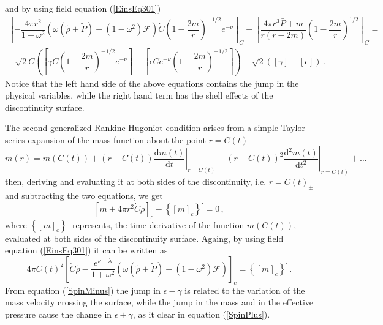 \documentclass[notitlepage,letterpaper, 10pt]{article}
\begin{document}
and by using field equation (\ref{EinsEq301})
\begin{align}
\left[ -\dfrac{4 \pi r^{2}}{1+\omega^{2}} \left(\omega \left(\tilde{\rho} + \tilde{P} \right)+ \left(1-\omega^{2} \right)\mathcal{F} \right) \dot{C} \left(1-\dfrac{2m}{r} \right)^{-1/2} e^{-\nu} \right]_{C} 
 \nonumber 
+ \left[\dfrac{4\pi r^{3}\bar{P}+m}{r \left( r-2m \right)}\left(1-\dfrac{2m}{r} \right)^{1/2}\right]_{C} = \quad \quad 
\nonumber \\ -\sqrt{2}C \left( \left[ \gamma \dot{C}\left( 1-\dfrac{2m}{r} \right)^{-1/2} e^{-\nu}\right]- \left[ \epsilon \dot{C} e^{-\nu}\left( 1-\dfrac{2m}{r} \right)^{-1/2}\right]\right)- \sqrt{2} \left(\left[ \gamma\right] + \left[ \epsilon \right] \right)\, .
    \label{GenRankineHugoniot1var}
\end{align}
Notice that the left hand side of the above equations contains the jump in the physical variables, while the right hand term has the shell effects of the discontinuity surface. 

The second generalized Rankine-Hugoniot condition arises from a simple Taylor series expansion of the mass function about the point $r = C(t)$
\begin{equation}
    m(r) = m(C(t)) + (r - C(t))\left.\frac{\textrm{d}m(t)}{\textrm{d}t}\right|_{r=C(t)} + (r - C(t))^{2}\left.\frac{\textrm{d}^{2}m(t)}{\textrm{d}t^{2}}\right|_{r=C(t)} + \dots
\end{equation}
then, deriving and evaluating it at both sides of the discontinuity, i.e. $r =C(t)_{\pm}$ and subtracting the two equations, we get 
\begin{equation}
  \left[ \dot{m} + 4\pi r^{2}\dot{C}\tilde{\rho} \right]_{c}- \left\{\left[ m \right]_{c} \right\}^{\cdot}  = 0 \, ,
    \label{GenRankineHugoniot2}  
\end{equation}
where $\left\{\left[ m \right]_{c} \right\}^{\cdot}$ represents, the time derivative of the function $m(C(t))$, evaluated at both sides of the discontinuity surface. Againg, by using field equation (\ref{EinsEq301}) it can be written as
\begin{equation}
  4\pi C(t)^{2}\left[ \dot{C}\tilde{\rho} -\frac{ e^{\nu-\lambda}}{1+\omega^{2}}\left( \omega(\tilde{\rho}+ \tilde{P})+ (1-\omega^{2})\mathcal{F}     \right) \right]_{c} = \left\{\left[ m \right]_{c} \right\}^{\cdot} \, .
    \label{GenRankineHugoniot2var}    
\end{equation}
From equation (\ref{SpinMinus}) the jump in $\epsilon - \gamma$ is related to the variation of the mass velocity crossing the surface, while the jump in the mass and in the effective pressure cause the change in $\epsilon + \gamma$, as it clear in equation (\ref{SpinPlus}). 
\end{document}
